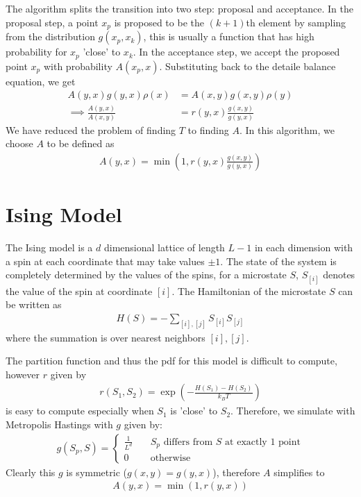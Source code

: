 \documentclass{article}
\begin{document}
The algorithm splits the transition into two step: proposal and acceptance. In the proposal step, a point $x_p$ is proposed to be the $(k+1)$th element
by sampling from the distribution $g(x_p, x_k)$, this is usually a function that has high probability for $x_p$ 'close' to $x_k$. In the acceptance step,
we accept the proposed point $x_p$ with probability $A(x_p, x)$. Substituting back to the detaile balance equation, we get
\begin{align*}
    A(y, x) g(y, x) \rho(x)          & = A(x, y) g(x, y) \rho(y)         \\
    \implies \frac{A(y, x)}{A(x, y)} & = r(y, x) \frac{g(x, y)}{g(y, x)}
\end{align*}
We have reduced the problem of finding $T$ to finding $A$. In this algorithm, we choose $A$ to be defined as
\begin{align*}
    A(y, x) = \min\left(1, r(y, x) \frac{g(x, y)}{g(y, x)}\right)
\end{align*}

\section{Ising Model}

The Ising model is a $d$ dimensional lattice of length $L - 1$ in each dimension with a spin at each coordinate that may take values $\pm 1$.
The state of the system is completely determined by the values of the spins,
for a microstate $S$, $S_{[i]}$ denotes the value of the spin at coordinate $[i]$.
The Hamiltonian of the microstate $S$ can be written as
\begin{align*}
    H(S) = - \sum_{[i],[j]} S_{[i]} S_{[j]}
\end{align*}
where the summation is over nearest neighbors $[i], [j]$.

The partition function and thus the pdf for this model is difficult to compute, however $r$ given by
\begin{align*}
    r(S_1, S_2) = \exp\left(-\frac{H(S_1) - H(S_2)}{k_B T}\right)
\end{align*}
is easy to compute especially when $S_1$ is 'close' to $S_2$.
Therefore, we simulate with Metropolis Hastings with $g$ given by:
\begin{align*}
    g(S_p, S) = \begin{cases}
                    \frac{1}{L^d}\quad & \text{$S_p$ differs from $S$ at exactly $1$ point} \\
                    0                  & \text{otherwise}
                \end{cases}
\end{align*}
Clearly this $g$ is symmetric ($g(x, y) = g(y, x)$), therefore $A$ simplifies to
\begin{align*}
    A(y, x) = \min(1, r(y, x))
\end{align*}
\end{document}
